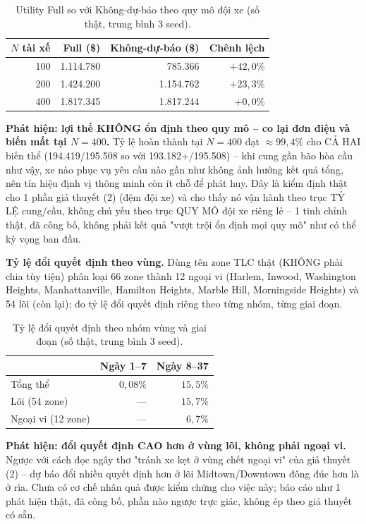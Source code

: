 \documentclass[10pt,twocolumn,a4paper]{article}
\begin{document}
\begin{table}[h!]
\centering
\caption{Utility Full so với Không-dự-báo theo quy mô đội xe (số thật, trung bình 3 seed).}
\label{tab:fleetscale}
\footnotesize
\begin{tabular}{@{}rrrr@{}}
\toprule
$N$ tài xế & Full (\$) & Không-dự-báo (\$) & Chênh lệch \\
\midrule
100 & 1.114.780 & 785.366 & $+42,0\%$ \\
200 & 1.424.200 & 1.154.762 & $+23,3\%$ \\
400 & 1.817.345 & 1.817.244 & $+0,0\%$ \\
\bottomrule
\end{tabular}
\end{table}

\textbf{Phát hiện: lợi thế KHÔNG ổn định theo quy mô -- co lại đơn điệu và
biến mất tại $N=400$.} Tỷ lệ hoàn thành tại $N=400$ đạt $\approx99,4\%$ cho
CẢ HAI biến thể (194.419/195.508 so với 193.182+/195.508) -- khi cung gần
bão hòa cầu như vậy, xe nào phục vụ yêu cầu nào gần như không ảnh hưởng kết
quả tổng, nên tín hiệu định vị thông minh còn ít chỗ để phát huy. Đây là
kiểm định thật cho 1 phần giả thuyết (2) (đệm đội xe) và cho thấy nó vận
hành theo trục TỶ LỆ cung/cầu, không chủ yếu theo trục QUY MÔ đội xe riêng
lẻ -- 1 tinh chỉnh thật, đã công bố, không phải kết quả "vượt trội ổn định
mọi quy mô" như có thể kỳ vọng ban đầu.

\textbf{Tỷ lệ đổi quyết định theo vùng.} Dùng tên zone TLC thật (KHÔNG phải
chia tùy tiện) phân loại 66 zone thành 12 ngoại vi (Harlem, Inwood,
Washington Heights, Manhattanville, Hamilton Heights, Marble Hill,
Morningside Heights) và 54 lõi (còn lại); đo tỷ lệ đổi quyết định riêng
theo từng nhóm, từng giai đoạn.

\begin{table}[h!]
\centering
\caption{Tỷ lệ đổi quyết định theo nhóm vùng và giai đoạn (số thật, trung bình 3 seed).}
\label{tab:spatial}
\footnotesize
\begin{tabular}{@{}lrr@{}}
\toprule
& Ngày 1--7 & Ngày 8--37 \\
\midrule
Tổng thể & $0,08\%$ & $15,5\%$ \\
Lõi (54 zone) & --- & $15,7\%$ \\
Ngoại vi (12 zone) & --- & $6,7\%$ \\
\bottomrule
\end{tabular}
\end{table}

\textbf{Phát hiện: đổi quyết định CAO hơn ở vùng lõi, không phải ngoại vi.}
Ngược với cách đọc ngây thơ "tránh xe kẹt ở vùng chết ngoại vi" của giả
thuyết (2) -- dự báo đổi nhiều quyết định hơn ở lõi Midtown/Downtown đông
đúc hơn là ở rìa. Chưa có cơ chế nhân quả được kiểm chứng cho việc này; báo
cáo như 1 phát hiện thật, đã công bố, phần nào ngược trực giác, không ép
theo giả thuyết có sẵn.
\end{document}
